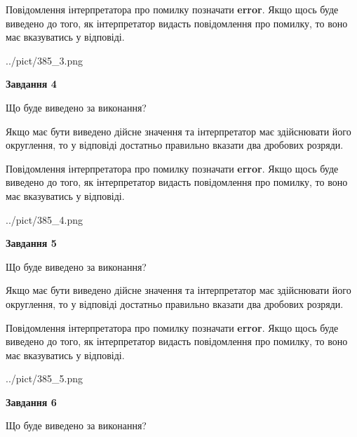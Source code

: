 \documentclass[12pt, ukrainian]{article}
\begin{document}
{\begin {Large}
Повідомлення інтерпретатора про помилку позначати \textbf{error}.
Якщо щось буде виведено до того, як інтерпретатор видасть повідомлення про помилку, 
то воно має вказуватись у відповіді. \par

\begin{center}
	{../pict/385_3.png}
\end{center}
\newpage

{\begin {center}\textbf{Завдання 4}\end {center}}\par
Що буде виведено за виконання? \par

Якщо має бути виведено дійсне значення та інтерпретатор має здійснювати його округлення, 
то у відповіді достатньо правильно вказати два дробових розряди.

Повідомлення інтерпретатора про помилку позначати \textbf{error}.
Якщо щось буде виведено до того, як інтерпретатор видасть повідомлення про помилку, 
то воно має вказуватись у відповіді. \par

\begin{center}
	{../pict/385_4.png}
\end{center}
\newpage

{\begin {center}\textbf{Завдання 5}\end {center}}\par
Що буде виведено за виконання? \par

Якщо має бути виведено дійсне значення та інтерпретатор має здійснювати його округлення, 
то у відповіді достатньо правильно вказати два дробових розряди.

Повідомлення інтерпретатора про помилку позначати \textbf{error}.
Якщо щось буде виведено до того, як інтерпретатор видасть повідомлення про помилку, 
то воно має вказуватись у відповіді. \par

\begin{center}
	{../pict/385_5.png}
\end{center}
\newpage

{\begin {center}\textbf{Завдання 6}\end {center}}\par
Що буде виведено за виконання? \par


\end{Large}}
\end{document}

